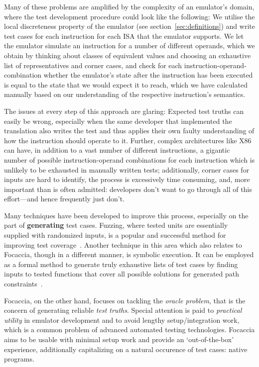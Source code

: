 Many of these problems are amplified by the complexity of an emulator's domain, where the test development procedure
could look like the following: We utilise the local discreteness property of the emulator (see
section~\ref{sec:definitions}) and write test cases for each instruction for each ISA that the emulator supports. We let
the emulator simulate an instruction for a number of different operands, which we obtain by thinking about classes of
equivalent values and choosing an exhaustive list of representatives and corner cases, and check for each
instruction-operand-combination whether the emulator's state after the instruction has been executed is equal to the
state that we would expect it to reach, which we have calculated manually based on our understanding of the respective
instruction's semantics.

The issues at every step of this approach are glaring: Expected test truths can easily be wrong, especially when the
same developer that implemented the translation also writes the test and thus applies their own faulty understanding of
how the instruction should operate to it. Further, complex architectures like X86 can have, in addition to a vast number
of different instructions, a gigantic number of possible instruction-operand combinations for each instruction which is
unlikely to be exhausted in manually written tests; additionally, corner cases for inputs are hard to identify, the
process is excessively time consuming, and, more important than is often admitted: developers don't want to go through
all of this effort---and hence frequently just don't.

Many techniques have been developed to improve this process, especially on the part of \textbf{generating} test cases.
Fuzzing, where tested units are essentially supplied with randomized inputs, is a popular and successful method for
improving test coverage~\cite{Zhu+2022Fuzzing}. Another technique in this area which also relates to Focaccia, though in
a different manner, is symbolic execution. It can be employed as a formal method to generate truly exhaustive lists of
test cases by finding inputs to tested functions that cover all possible solutions for generated path
constraints~\cite{Li2011SymbexecTestGeneration}.

Focaccia, on the other hand, focuses on tackling the \textit{oracle problem}, that is the concern of generating reliable
\textit{test truths}. Special attention is paid to \textit{practical utility} in emulator development and to avoid
lengthy setup/integration work, which is a common problem of advanced automated testing technologies. Focaccia aims to
be usable with minimal setup work and provide an `out-of-the-box' experience, additionally capitalizing on a natural
occurence of test cases: native programs.

